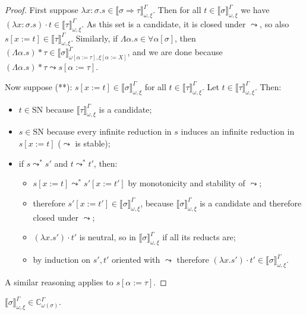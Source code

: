 \documentclass[runningheads,a4paper]{llncs}
\newcommand{\quant}[2]{\forall #1[#2]}
\newcommand{\arrtype}{\Rightarrow}
\newcommand{\abs}[2]{\lambda #1.#2}
\newcommand{\tabs}[2]{\Lambda #1.#2}
\newcommand{\app}[2]{#1 \cdot #2}
\newcommand{\tapp}[2]{#1 * #2}
\newcommand{\subst}[2]{#1:=#2}
\newcommand{\SN}{\mathrm{SN}}
\newcommand{\Cb}{\mathbb{C}}
\newcommand{\val}[3]{\ensuremath{\llbracket#1\rrbracket_{#2}^{#3}}}
\begin{document}
\begin{proof}
  First suppose $\abs{x:\sigma}{s} \in \val{\sigma \arrtype \tau}{\omega,
  \xi}{\Gamma}$.  Then for all $t \in \val{\sigma}{\omega,\xi}{\Gamma}$ we
  have $\app{(\abs{x:\sigma}{s})}{t} \in \val{\tau}{\omega,\xi}{\Gamma}$.
  As this set is a candidate, it is closed under $\leadsto$, so also
  $s[x:=t] \in \val{\tau}{\omega,\xi}{\Gamma}$.
  Similarly, if $\tabs{\alpha}{s} \in \quant{\alpha}{\sigma}$, then
  $\tapp{(\tabs{\alpha}{s})}{\tau} \in \val{\sigma}{
  \omega[\subst{\alpha}{\tau}],\xi[\subst{\alpha}{X}]}{\Gamma}$, and we are
  done because $\tapp{(\tabs{\alpha}{s})}{\tau} \leadsto s[\alpha:=\tau]$.

  Now suppose (**): $s[x:=t] \in \val{\sigma}{\omega,\xi}{\Gamma}$ for all
  $t \in \val{\tau}{\omega,\xi}{\Gamma}$.  Let $t \in \val{\tau}{\omega,
  \xi}{\Gamma}$.  Then:
  \begin{itemize}
  \item $t \in \SN$ because $\val{\tau}{\omega,\xi}{\Gamma}$ is a candidate;
  \item $s \in \SN$ because every infinite reduction in $s$ induces an
    infinite reduction in $s[x:=t]$ ($\leadsto$ is stable);
  \item if $s \leadsto^* s'$ and $t \leadsto^* t'$, then:
    \begin{itemize}
    \item $s[x:=t] \leadsto^* s'[x:=t']$ by monotonicity and stability of
      $\leadsto$;
    \item therefore $s'[x:=t'] \in \val{\sigma}{\omega,\xi}{\Gamma}$, because
      $\val{\sigma}{\omega,\xi}{\Gamma}$ is a candidate and therefore closed
      under $\leadsto$;
    \item $\app{(\abs{x}{s'})}{t'}$ is neutral, so in
      $\val{\sigma}{\omega,\xi}{\Gamma}$ if all its reducts are;
    \item by induction on $s',t'$ oriented with $\leadsto$ therefore
      $\app{(\abs{x}{s'})}{t'} \in \val{\sigma}{\omega,\xi}{\Gamma}$.
    \end{itemize}
  \end{itemize}
  A similar reasoning applies to $s[\alpha:=\tau]$.
\end{proof}

\begin{lemma}\label{lem_val_computable}
  $\val{\sigma}{\omega,\xi}{\Gamma} \in \Cb_{\omega(\sigma)}^\Gamma$.
\end{lemma}
\end{document}
